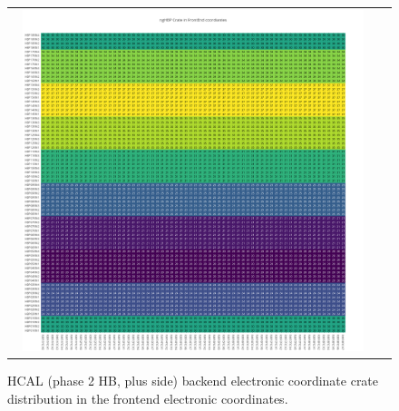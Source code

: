 \clearpage
\begin{figure}[htb]
 \begin{center}
  \begin{tabular}{cc}
   \includegraphics[angle=0,width=0.95\textwidth]{figures/appendix/ngHBP_Crate_in_FrontEnd.png}
  \end{tabular}
  \caption{HCAL (phase 2 HB, plus side) backend electronic coordinate crate distribution in the frontend electronic coordinates.}
  \label{fig:lmapngHBPCrateFEC}
 \end{center}
\end{figure}

